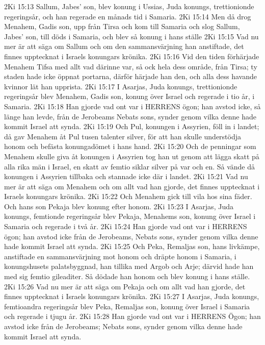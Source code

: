 2Ki 15:13  Sallum, Jabes' son, blev konung i Ussias, Juda konungs, trettionionde regeringsår, och han regerade en månads tid i Samaria.
2Ki 15:14  Men då drog Menahem, Gadis son, upp från Tirsa och kom till Samaria och slog Sallum, Jabes' son, till döds i Samaria, och blev så konung i hans ställe
2Ki 15:15  Vad nu mer är att säga om Sallum och om den sammansvärjning han anstiftade, det finnes upptecknat i Israels konungars krönika.
2Ki 15:16  Vid den tiden förhärjade Menahem Tifsa med allt vad därinne var, så ock hela dess område, från Tirsa; ty staden hade icke öppnat portarna, därför härjade han den, och alla dess havande kvinnor lät han upprista.
2Ki 15:17  I Asarjas, Juda konungs, trettionionde regeringsår blev Menahem, Gadis son, konung över Israel och regerade i tio år, i Samaria.
2Ki 15:18  Han gjorde vad ont var i HERRENS ögon; han avstod icke, så länge han levde, från de Jerobeams Nebats sons, synder genom vilka denne hade kommit Israel att synda.
2Ki 15:19  Och Pul, konungen i Assyrien, föll in i landet; då gav Menahem åt Pul tusen talenter silver, för att han skulle understödja honom och befästa konungadömet i hans hand.
2Ki 15:20  Och de penningar som Menahem skulle giva åt konungen i Assyrien tog han ut genom att lägga skatt på alla rika män i Israel, en skatt av femtio siklar silver på var och en. Så vände då konungen i Assyrien tillbaka och stannade icke där i landet.
2Ki 15:21  Vad nu mer är att säga om Menahem och om allt vad han gjorde, det finnes upptecknat i Israels konungars krönika.
2Ki 15:22  Och Menahem gick till vila hos sina fäder. Och hans son Pekaja blev konung efter honom.
2Ki 15:23  I Asarjas, Juda konungs, femtionde regeringsår blev Pekaja, Menahems son, konung över Israel i Samaria och regerade i två år.
2Ki 15:24  Han gjorde vad ont var i HERRENS ögon; han avstod icke från de Jerobeams, Nebats sons, synder genom vilka denne hade kommit Israel att synda.
2Ki 15:25  Och Peka, Remaljas son, hans livkämpe, anstiftade en sammansvärjning mot honom och dräpte honom i Samaria, i konungshusets palatsbyggnad, han tillika med Argob och Arje; därvid hade han med sig femtio gileaditer. Så dödade han honom och blev konung i hans ställe.
2Ki 15:26  Vad nu mer är att säga om Pekaja och om allt vad han gjorde, det finnes upptecknat i Israels konungars krönika.
2Ki 15:27  I Asarjas, Juda konungs, femtioandra regeringsår blev Peka, Remaljas son, konung över Israel i Samaria och regerade i tjugu år.
2Ki 15:28  Han gjorde vad ont var i HERRENS Ögon; han avstod icke från de Jerobeams; Nebats sons, synder genom vilka denne hade kommit Israel att synda.
